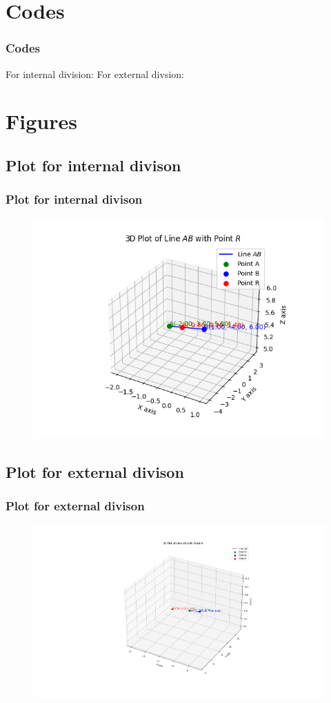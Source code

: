 \documentclass{beamer}
\theoremstyle{remark}
\numberwithin{equation}{section}
\begin{document}
\section{Codes}
\begin{frame}[fragile]
\frametitle{Codes}
For internal division:
For external divsion:





\end{frame}

\section{Figures}
\subsection{Plot for internal divison}
\begin{frame}
\frametitle{Plot for internal divison}
\begin{figure}[hbt!]
		\centering
		\includegraphics[width=0.8\linewidth]{plots/plot1.png}

	\end{figure}
\end{frame}

\subsection{Plot for external divison}
\begin{frame}
\frametitle{Plot for external divison}
\begin{figure}[hbt!]
		\centering
		\includegraphics[width=0.9\linewidth]{plots/plot2.png}

	\end{figure}


\end{frame}
\end{document}
